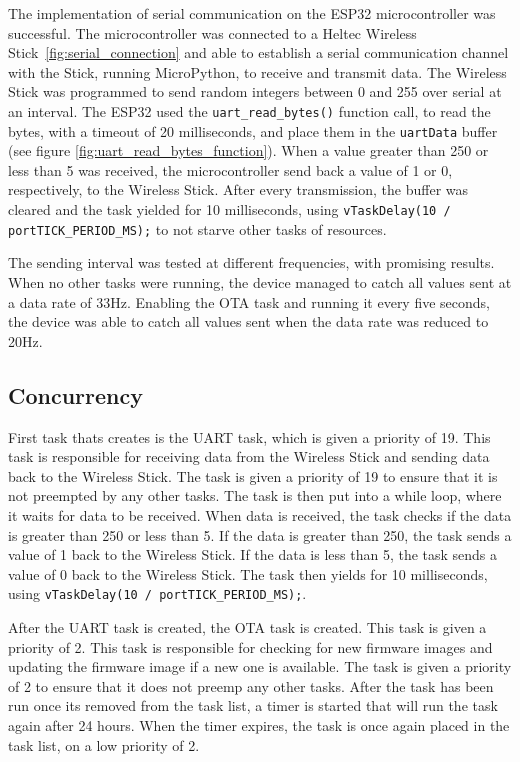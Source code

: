 The implementation of serial communication on the ESP32 microcontroller was successful. The microcontroller was connected to a Heltec Wireless Stick~\ref{fig:serial_connection} and able to establish a serial communication channel with the Stick, running MicroPython, to receive and transmit data. The Wireless Stick was programmed to send random integers between 0 and 255 over serial at an interval. The ESP32 used the \texttt{uart\_read\_bytes()} function call, to read the bytes, with a timeout of 20 milliseconds, and place them in the \texttt{uartData} buffer (see figure \ref{fig:uart_read_bytes_function}). When a value greater than 250 or less than 5 was received, the microcontroller send back a value of 1 or 0, respectively, to the Wireless Stick. After every transmission, the buffer was cleared and the task yielded for 10 milliseconds, using \texttt{vTaskDelay(10 / portTICK\_PERIOD\_MS);} to not starve other tasks of resources.

The sending interval was tested at different frequencies, with promising results. When no other tasks were running, the device managed to catch all values sent at a data rate of 33Hz. Enabling the OTA task and running it every five seconds, the device was able to catch all values sent when the data rate was reduced to 20Hz.

\subsection{Concurrency}

First task thats creates is the UART task, which is given a priority of 19. This task is responsible for receiving data from the Wireless Stick and sending data back to the Wireless Stick. The task is given a priority of 19 to ensure that it is not preempted by any other tasks. The task is then put into a while loop, where it waits for data to be received. When data is received, the task checks if the data is greater than 250 or less than 5. If the data is greater than 250, the task sends a value of 1 back to the Wireless Stick. If the data is less than 5, the task sends a value of 0 back to the Wireless Stick. The task then yields for 10 milliseconds, using \texttt{vTaskDelay(10 / portTICK\_PERIOD\_MS);}.

After the UART task is created, the OTA task is created. This task is given a priority of 2. This task is responsible for checking for new firmware images and updating the firmware image if a new one is available. The task is given a priority of 2 to ensure that it does not preemp any other tasks. After the task has been run once its removed from the task list, a timer is started that will run the task again after 24 hours. When the timer expires, the task is once again placed in the task list, on a low priority of 2.

